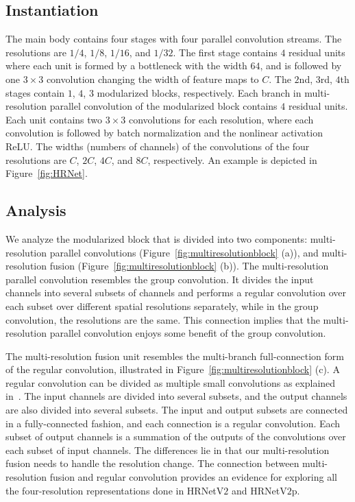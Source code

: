 \documentclass[10pt,journal,compsoc]{IEEEtran}
\begin{document}
\subsection{Instantiation}
The main body 
contains four stages
with four parallel convolution streams.
The resolutions are $1/4$, $1/8$, $1/16$, and $1/32$. 
The first stage contains $4$ residual units 
where each unit
is formed by a bottleneck with the width $64$,
and is followed by one $3 \times3$ convolution
changing the width of feature maps
to $C$.
The $2$nd, $3$rd, $4$th stages
contain $1$, $4$, $3$ modularized blocks, respectively.
Each branch in multi-resolution parallel convolution of 
the modularized block 
contains $4$ residual units. 
Each unit contains two $3\times3$ convolutions for each resolution,
where each convolution is followed by batch normalization and the nonlinear activation ReLU.
The widths (numbers of channels) of the convolutions
of the four resolutions 
are $C$, $2C$, $4C$, and $8C$, respectively.
An example is depicted in Figure~\ref{fig:HRNet}.

\subsection{Analysis}
We analyze the modularized block 
that is divided into
two components: multi-resolution parallel convolutions
(Figure~\ref{fig:multiresolutionblock} (a)),
and multi-resolution fusion (Figure~\ref{fig:multiresolutionblock} (b)).
The multi-resolution parallel convolution resembles the group convolution. It divides the input channels 
into several subsets of channels 
and performs a regular convolution 
over each subset 
over different spatial resolutions separately,
while in the group convolution,
the resolutions are the same.
This connection implies that
the multi-resolution parallel convolution
enjoys some benefit of the group convolution. 

The multi-resolution fusion unit 
resembles the multi-branch full-connection form
of the regular convolution, illustrated in Figure~\ref{fig:multiresolutionblock} (c).
A regular convolution 
can be divided as multiple small convolutions
as explained in~\cite{ZhangQ0W17}.
The input channels are divided into several subsets,
and the output channels are also divided into several subsets.
The input and output subsets are connected 
in a fully-connected fashion,
and each connection is a regular convolution.
Each subset of output channels
is a summation of the outputs of the convolutions 
over each subset of input channels. 
The differences lie in that our multi-resolution fusion
needs to handle the resolution change.
The connection between multi-resolution fusion
and regular convolution provides
an evidence
for exploring all the four-resolution representations
done in HRNetV$2$ and HRNetV$2$p.
\end{document}
